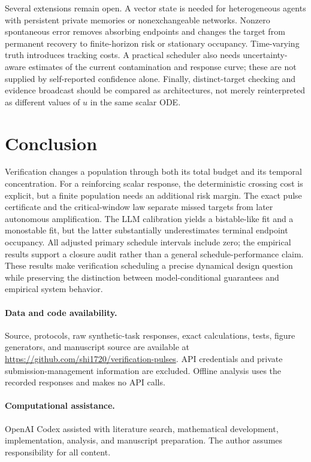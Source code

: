 \documentclass[11pt]{article}
\theoremstyle{remark}\newtheorem{remark}[theorem]{Remark}
\begin{document}
Several extensions remain open. A vector state is needed for heterogeneous agents with persistent private memories or nonexchangeable networks. Nonzero spontaneous error removes absorbing endpoints and changes the target from permanent recovery to finite-horizon risk or stationary occupancy. Time-varying truth introduces tracking costs. A practical scheduler also needs uncertainty-aware estimates of the current contamination and response curve; these are not supplied by self-reported confidence alone. Finally, distinct-target checking and evidence broadcast should be compared as architectures, not merely reinterpreted as different values of $u$ in the same scalar ODE.

\section{Conclusion}
Verification changes a population through both its total budget and its temporal concentration. For a reinforcing scalar response, the deterministic crossing cost is explicit, but a finite population needs an additional risk margin. The exact pulse certificate and the critical-window law separate missed targets from later autonomous amplification. The LLM calibration yields a bistable-like fit and a monostable fit, but the latter substantially underestimates terminal endpoint occupancy. All adjusted primary schedule intervals include zero; the empirical results support a closure audit rather than a general schedule-performance claim. These results make verification scheduling a precise dynamical design question while preserving the distinction between model-conditional guarantees and empirical system behavior.

\paragraph{Data and code availability.}
Source, protocols, raw synthetic-task responses, exact calculations, tests, figure generators, and manuscript source are available at \url{https://github.com/shi1720/verification-pulses}. API credentials and private submission-management information are excluded. Offline analysis uses the recorded responses and makes no API calls.

\paragraph{Computational assistance.}
OpenAI Codex assisted with literature search, mathematical development, implementation, analysis, and manuscript preparation. The author assumes responsibility for all content.
\end{document}
